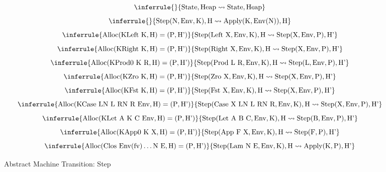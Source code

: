 \begin{figure}
	\[
	\inferrule{ }{\text{State}, \text{Heap} \leadsto \text{State}, \text{Heap}}
	\]
	\[
	\inferrule{ }{\text{Step}(\text{N}, \text{Env}, \text{K}), \text{H} \leadsto \text{Apply}(\text{K}, \text{Env}(\text{N})), \text{H}}
	\]
	\[
	\inferrule{\text{Alloc}(\text{KLeft}\ \text{K}, \text{H}) = (\text{P}, \text{H'})}{\text{Step}(\text{Left}\ \text{X}, \text{Env}, \text{K}), \text{H} \leadsto \text{Step}(\text{X}, \text{Env}, \text{P}), \text{H'}}
	\]
	\[
	\inferrule{\text{Alloc}(\text{KRight}\ \text{K}, \text{H}) = (\text{P}, \text{H'})}{\text{Step}(\text{Right}\ \text{X}, \text{Env}, \text{K}), \text{H} \leadsto \text{Step}(\text{X}, \text{Env}, \text{P}), \text{H'}}
	\]
	\[
	\inferrule{\text{Alloc}(\text{KProd0}\ \text{K}\ \text{R}, \text{H}) = (\text{P}, \text{H'})}{\text{Step}(\text{Prod}\ \text{L}\ \text{R}, \text{Env}, \text{K}), \text{H} \leadsto \text{Step}(\text{L}, \text{Env}, \text{P}), \text{H'}}
	\]
	\[
	\inferrule{\text{Alloc}(\text{KZro}\ \text{K}, \text{H}) = (\text{P}, \text{H'})}{\text{Step}(\text{Zro}\ \text{X}, \text{Env}, \text{K}), \text{H} \leadsto \text{Step}(\text{X}, \text{Env}, \text{P}), \text{H'}}
	\]
	\[
	\inferrule{\text{Alloc}(\text{KFst}\ \text{K}, \text{H}) = (\text{P}, \text{H'})}{\text{Step}(\text{Fst}\ \text{X}, \text{Env}, \text{K}), \text{H} \leadsto \text{Step}(\text{X}, \text{Env}, \text{P}), \text{H'}}
	\]
	\[
	\inferrule{\text{Alloc}(\text{KCase}\ \text{LN}\ \text{L}\ \text{RN}\ \text{R}\ \text{Env}, \text{H}) = (\text{P}, \text{H'})}{\text{Step}(\text{Case}\ \text{X}\ \text{LN}\ \text{L}\ \text{RN}\ \text{R}, \text{Env}, \text{K}), \text{H} \leadsto \text{Step}(\text{X}, \text{Env}, \text{P}), \text{H'}}
	\]
	\[
	\inferrule{\text{Alloc}(\text{KLet}\ \text{A}\ \text{K}\ \text{C}\ \text{Env}, \text{H}) = (\text{P}, \text{H'})}{\text{Step}(\text{Let}\ \text{A}\ \text{B}\ \text{C}, \text{Env}, \text{K}), \text{H} \leadsto \text{Step}(\text{B}, \text{Env}, \text{P}), \text{H'}}
	\]
	\[
	\inferrule{\text{Alloc}(\text{KApp0}\ \text{K}\ \text{X}, \text{H}) = (\text{P}, \text{H'})}{\text{Step}(\text{App}\ \text{F}\ \text{X}, \text{Env}, \text{K}), \text{H} \leadsto \text{Step}(\text{F}, \text{P}), \text{H'}}
	\]
	\[
	\inferrule{\text{Alloc}(\text{Clos}\ \text{Env}(\text{fv})\dots \text{N}\ \text{E}, \text{H}) = (\text{P}, \text{H'})}{\text{Step}(\text{Lam}\ \text{N}\ \text{E}, \text{Env}, \text{K}), \text{H} \leadsto \text{Apply}(\text{K}, \text{P}), \text{H'}}
	\]
	\caption{Abstract Machine Transition: Step}
\end{figure}
